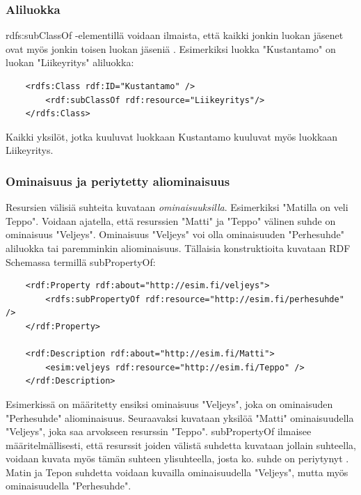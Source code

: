 \documentclass[finnish]{tktltiki2}
\theoremstyle{definition}
\theoremstyle{remark}
\begin{document}
\subsubsection{Aliluokka}
rdfs:subClassOf -elementillä voidaan ilmaista, että kaikki jonkin luokan jäsenet ovat myös jonkin toisen luokan jäseniä \cite{RDFS}. Esimerkiksi 
luokka "Kustantamo" on luokan "Liikeyritys" aliluokka:
\begin{verbatim}
    <rdfs:Class rdf:ID="Kustantamo" />
        <rdf:subClassOf rdf:resource="Liikeyritys"/>
    </rdfs:Class>
\end{verbatim}
Kaikki yksilöt, jotka kuuluvat luokkaan Kustantamo kuuluvat myös luokkaan Liikeyritys.
\subsubsection{Ominaisuus ja periytetty aliominaisuus}
Resursien välisiä suhteita kuvataan \textit{ominaisuuksilla}. Esimerkiksi "Matilla on veli Teppo". Voidaan ajatella, että resurssien "Matti" ja "Teppo" välinen suhde on ominaisuus "Veljeys". Ominaisuus "Veljeys" voi olla ominaisuuden "Perhesuhde"  aliluokka tai paremminkin aliominaisuus. Tällaisia konstruktioita kuvataan RDF Schemassa termillä subPropertyOf: 
\begin{verbatim}
    <rdf:Property rdf:about="http://esim.fi/veljeys">
        <rdfs:subPropertyOf rdf:resource="http://esim.fi/perhesuhde" />
    </rdf:Property>

    <rdf:Description rdf:about="http://esim.fi/Matti">
        <esim:veljeys rdf:resource="http://esim.fi/Teppo" />
    </rdf:Description>
\end{verbatim}
Esimerkissä on määritetty ensiksi ominaisuus "Veljeys", joka on ominaisuden "Perhesuhde" aliominaisuus. Seuraavaksi kuvataan yksilöä "Matti" ominaisuudella "Veljeys", joka saa arvokseen resurssin "Teppo". subPropertyOf ilmaisee määritelmällisesti, että resurssit joiden välistä suhdetta kuvataan jollain suhteella, voidaan kuvata myös tämän suhteen ylisuhteella, josta ko. suhde on periytynyt \cite{RDFS}. Matin ja Tepon suhdetta voidaan kuvailla ominaisuudella "Veljeys", mutta myös ominaisuudella "Perhesuhde". 
\end{document}
